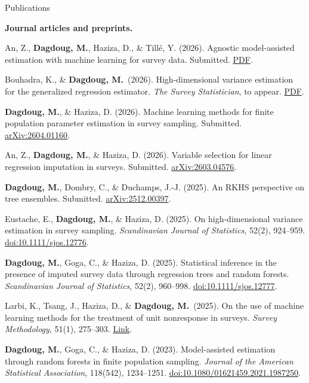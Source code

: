 \documentclass{resume}
\newcommand{\me}{\textbf{Dagdoug, M.}}                               %
\newcommand{\doi}[1]{\href{https://doi.org/#1}{doi:#1}}
\newcommand{\arxiv}[1]{\href{https://arxiv.org/abs/#1}{arXiv:#1}}
\newcommand{\site}[1]{\href{https://mehdidagdoug.github.io/files/#1}{PDF}}
\begin{document}
\begin{rSection}{Publications}
\vspace{2mm}

\textbf{Journal articles and preprints.}
\begin{etaremune}
  \item An, Z., \me, Haziza, D., \& Tillé, Y. (2026). Agnostic model-assisted estimation with machine learning for survey data. Submitted. \site{AnDagdougHazizaTille(2026).pdf}.

  \item Bouhadra, K., \& \me\ (2026). High-dimensional variance estimation for the generalized regression estimator. \emph{The Survey Statistician}, to appear. \site{BouhadraDagdoug(26).pdf}.

  \item \me, \& Haziza, D. (2026). Machine learning methods for finite population parameter estimation in survey sampling. Submitted. \arxiv{2604.01160}.

  \item An, Z., \me, \& Haziza, D. (2026). Variable selection for linear regression imputation in surveys. Submitted. \arxiv{2603.04576}.

  \item \me, Dombry, C., \& Duchamps, J.-J. (2025). An RKHS perspective on tree ensembles. Submitted. \arxiv{2512.00397}.

  \item Eustache, E., \me, \& Haziza, D. (2025). On high-dimensional variance estimation in survey sampling. \emph{Scandinavian Journal of Statistics}, 52(2), 924--959. \doi{10.1111/sjos.12776}.

  \item \me, Goga, C., \& Haziza, D. (2025). Statistical inference in the presence of imputed survey data through regression trees and random forests. \emph{Scandinavian Journal of Statistics}, 52(2), 960--998. \doi{10.1111/sjos.12777}.

  \item Larbi, K., Tsang, J., Haziza, D., \& \me\ (2025). On the use of machine learning methods for the treatment of unit nonresponse in surveys. \emph{Survey Methodology}, 51(1), 275--303. \href{https://www150.statcan.gc.ca/n1/en/catalogue/12-001-X202500100003}{Link}.

  \item \me, Goga, C., \& Haziza, D. (2023). Model-assisted estimation through random forests in finite population sampling. \emph{Journal of the American Statistical Association}, 118(542), 1234--1251. \doi{10.1080/01621459.2021.1987250}.


\end{etaremune}
\end{rSection}
\end{document}
